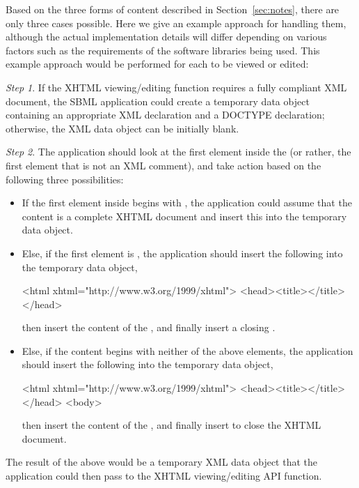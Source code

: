Based on the three forms of  content described in
Section~\ref{sec:notes}, there are only three cases possible.
Here we give an example approach for handling them, although the
actual implementation details will differ depending on various
factors such as the requirements of the software libraries being
used.  This example approach would be performed for each
 to be viewed or edited:
\begin{description}
  
\item \emph{Step 1}. If the XHTML viewing/editing function
  requires a fully compliant XML document, the SBML application
  could create a temporary data object containing an appropriate
  XML declaration and a DOCTYPE declaration; otherwise, the XML
  data object can be initially blank.
  
\item \emph{Step 2}. The application should look at the first
  element inside the  (or rather, the first element
  that is not an XML comment), and take action based on the
  following three possibilities:
  \begin{itemize}
    
  \item If the first element inside  begins with
    , the
    application could assume that the content is a complete XHTML
    document and insert this into the temporary data object.
    
  \item Else, if the first element is , the
    application should insert the following into the temporary
    data object, 

    \begin{example}
<html xhtml="http://www.w3.org/1999/xhtml">
    <head><title></title></head>\end{example}
    then insert the content of the , and finally
    insert a closing .
    
  \item Else, if the  content begins with neither of
    the above elements, the application should insert the
    following into the temporary data object,

    \begin{example}
<html xhtml="http://www.w3.org/1999/xhtml">
    <head><title></title></head>
    <body>\end{example}
    then insert the content of the , and finally
    insert  to close the XHTML document.
  \end{itemize}

\end{description}
The result of the above would be a temporary XML data object that
the application could then pass to the XHTML viewing/editing API
function.

